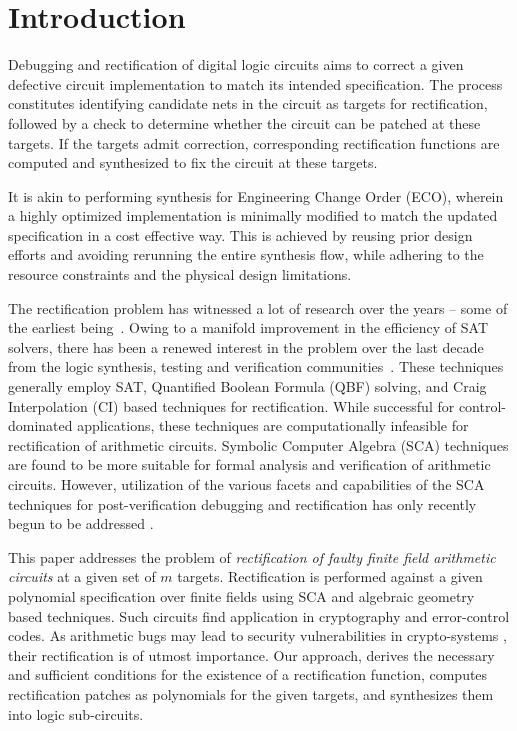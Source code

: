 \section{Introduction}
Debugging and rectification of digital logic circuits aims to correct
a given defective circuit implementation to match its intended
specification. The process constitutes identifying
candidate nets in the circuit as targets for rectification, followed by  
a check to determine whether the circuit can be patched at these
targets. If the targets admit correction, corresponding rectification
functions are computed and synthesized to fix the circuit at these targets.
{\red  
It is akin to performing synthesis for Engineering Change Order 
(ECO), wherein a highly optimized implementation is minimally modified to match the 
updated specification in a cost effective way. This is achieved by reusing prior design 
efforts and avoiding rerunning the entire synthesis flow, while adhering to the resource 
constraints and the physical design limitations.

The rectification problem has witnessed a lot of research over the years -- 
some of the earliest being~\cite{Sadowska:DAC95,scholl:1,andreas:2005}.
Owing to a manifold improvement in the efficiency of SAT solvers,
there has been a renewed interest in the problem over the last decade from 
the logic synthesis, testing and verification communities~\cite{
MF_Huang:DATE12,scholl:2,SS_Fujita:ISQED17,SS_Alan:DAC18}.
These techniques generally employ SAT, Quantified Boolean Formula (QBF) solving,
and Craig Interpolation (CI) based techniques for rectification. While
successful for control-dominated applications, these techniques are
computationally infeasible for rectification of arithmetic circuits.
Symbolic Computer Algebra (SCA) techniques are found to be more
suitable for formal analysis and verification of arithmetic circuits.
However, utilization of the various facets and capabilities of the SCA
techniques for post-verification debugging and rectification has only
recently begun to be addressed
\cite{farimah:2017:1,MF_Rolf:ISVLSI18,Utkarsh:VLSI18,
Vkrao:FMCAD18,Vkrao:ISQED21,Vkrao:GLSVLSI21}. }

This paper addresses the problem of {\it rectification
  of faulty finite field arithmetic circuits} at a given set of $m$
targets. Rectification is performed against a 
given polynomial specification over finite
fields using SCA and algebraic geometry based techniques. 
Such circuits find application in cryptography and error-control codes. 
{\red As arithmetic bugs may lead to security
vulnerabilities in crypto-systems \cite{crypto:bug_attacks}, their
rectification is of utmost importance. 
Our approach, derives the necessary and sufficient conditions
for the existence of a rectification function, computes rectification patches
as polynomials for the given targets, and synthesizes them into logic sub-circuits.}

